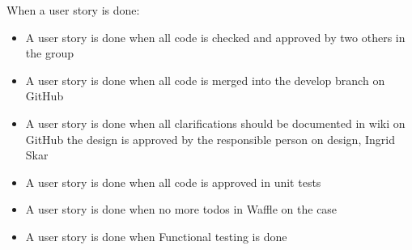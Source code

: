 \begin{description}
    \item[When a user story is done:]
\end{description}
\begin{itemize}[noitemsep]
    \item A user story is done when all code is checked and approved by two others in the group
    \item A user story is done when all code is merged into the develop branch on GitHub
    \item A user story is done when all clarifications should be documented in wiki on GitHub
the design is approved by the responsible person on design, Ingrid Skar
    \item A user story is done when all code is approved in unit tests
    \item A user story is done when no more todos in Waffle on the case
    \item A user story is done when Functional testing is done
\end{itemize}

